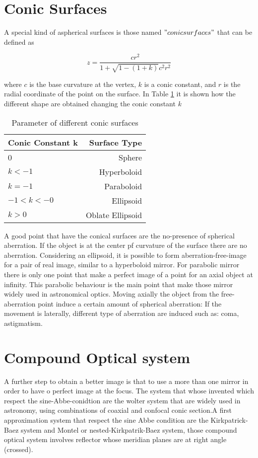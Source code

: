 \section{Conic Surfaces}

A special kind of aspherical surfaces is those named $"conic surfaces"$ that can be defined as

\begin{equation}
	z = \frac{c r^2}{1 + \sqrt{1 - (1 + k)} c^2 r^2}
\end{equation}

\noindent where $c $ is the base curvature at the vertex, $k $ is a conic constant, and $r $ is the radial coordinate of the point on the surface. In Table \ref{tab: conic surface} it is shown how the different shape are obtained changing the conic constant $k $

\begin{table}[ht]
	\centering
		\begin{tabular}{l|r}
			Conic Constant k & Surface Type\\
			\hline
			0 & Sphere \\
			$k < -1 $ & Hyperboloid \\
			$k = -1 $ & Paraboloid \\
			$-1 < k < -0 $ & Ellipsoid \\
			$k > 0 $ & Oblate Ellipsoid \\	
		\end{tabular}
	\caption{Parameter of different conic surfaces}
	\label{tab: conic surface}
\end{table}

\noindent A good point that have the conical surfaces are the no-presence of spherical aberration. If the object is at the center pf curvature of the surface there are no aberration. Considering an ellipsoid, it is possible to form aberration-free-image for a pair of real image, similar to a hyperboloid mirror. For parabolic mirror there is only one point that make a perfect image of a point for an axial object at infinity. This parabolic behaviour is the main point that make those mirror widely used in astronomical optics. Moving axially the object from the free-aberration point induce a certain amount of spherical aberration: If the movement is laterally, different type of aberration are induced such as: coma, astigmatism.

\section{Compound Optical system}
A further step to obtain a better image is that to use a more than one mirror in order to have o perfect image at the focus. The system that whose invented which respect the sine-Abbe-conidtion are the wolter system that are widely used in astronomy, using combinations of coaxial and confocal conic section.A first approximation system that respect the sine Abbe condition are the Kirkpatrick-Baez system and Montel or nested-Kirkpatrik-Baez system, those compound optical system involves reflector whose meridian planes are at right angle (crossed).

